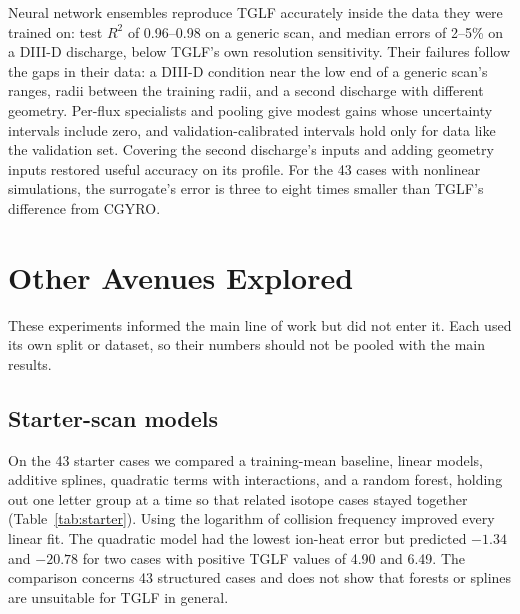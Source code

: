 \documentclass[12pt,letterpaper]{article}
\begin{document}
Neural network ensembles reproduce TGLF accurately inside the data they were trained on:
test $R^2$ of 0.96--0.98 on a generic scan, and median errors of 2--5\% on a DIII-D
discharge, below TGLF's own resolution sensitivity. Their failures follow the gaps in their
data: a DIII-D condition near the low end of a generic scan's ranges, radii between the
training radii, and a second discharge with different geometry. Per-flux specialists and pooling
give modest gains whose uncertainty intervals include zero, and validation-calibrated
intervals hold only for data like the validation set. Covering the second discharge's
inputs and adding geometry inputs restored useful accuracy on its profile. For the 43
cases with nonlinear simulations, the surrogate's error is three to eight times smaller
than TGLF's difference from CGYRO.

\makereference




\clearpage
\appendix

\section{Other Avenues Explored}
\label{app:other}

These experiments informed the main line of work but did not enter it. Each used its own
split or dataset, so their numbers should not be pooled with the main results.

\subsection{Starter-scan models}
\label{app:starter}

On the 43 starter cases we compared a training-mean baseline, linear models, additive
splines, quadratic terms with interactions, and a random forest, holding out one letter
group at a time so that related isotope cases stayed together (Table~\ref{tab:starter}).
Using the logarithm of collision frequency improved every linear fit. The quadratic model
had the lowest ion-heat error but predicted $-1.34$ and $-20.78$ for two cases with
positive TGLF values of 4.90 and 6.49. The comparison concerns 43 structured cases and does
not show that forests or splines are unsuitable for TGLF in general.
\end{document}
